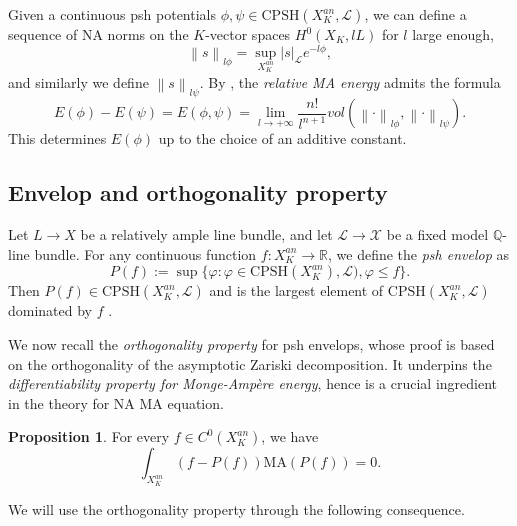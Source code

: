 \documentclass[a4paper]{article}
\theoremstyle{definition}
\newtheorem{prop}[thm]{Proposition}
\newcommand{\R}{\mathbb{R}}
\newcommand{\Q}{\mathbb{Q}}
\newcommand{\norm}[1]{\left\lVert#1\right\rVert}
\begin{document}
	
	
	
	
	
	Given a continuous psh potentials $\phi, \psi \in \text{CPSH}(X_K^{an}, \mathcal{L})$, we can define a sequence of NA norms on the $K$-vector spaces $H^0(X_K, lL)$ for $l$ large enough,
	\[
	\norm{s}_{l\phi}= \sup_{X_K^{an}} |s|_{\mathcal{L}} e^{-l\phi},
	\]
	and similarly we define $\norm{s}_{l\psi}$. 
	By \cite[Theorem A]{Boucksomnew1}, the \emph{relative MA energy} admits the formula
	\[
	E(\phi)-E(\psi)= E(\phi, \psi)=  \lim_{l\to +\infty} \frac{n!}{ l^{n+1}} vol(   \norm{\cdot}_{l\phi}, \norm{\cdot}_{l\psi}     ) .
	\] 
	This determines $E(\phi)$ up to the choice of an additive constant. 
	
	
	
	
	
	
	
	
			
	\subsection{Envelop and orthogonality property}\label{sec:envelop}
	
	
	
	
	Let $L\to X$ be a relatively ample line bundle, and 
	let $\mathcal{L}\to \mathcal{X}$ be a fixed model $\Q$-line bundle.
	For any continuous function $f: X_K^{an}\to \R$, we define the \emph{psh envelop} as 
	\[
	P(f):= \sup \{    \varphi:  \varphi\in \text{CPSH}(X_K^{an}), \mathcal{L}), \varphi\leq f        \}.
	\]
	Then $P(f)\in \text{CPSH}(X_K^{an}, \mathcal{L})$ and is the largest element of $ \text{CPSH}(X_K^{an}, \mathcal{L})$  dominated by $f$ \cite[Prop. 8.2]{Boucksomsemipositive}. 
	
	

	
	We now recall the \emph{orthogonality property} for psh envelops, whose proof is based on the orthogonality of the asymptotic Zariski decomposition. It underpins the \emph{differentiability property for Monge-Amp\`ere energy}, hence is a crucial ingredient in the theory for NA MA equation.
	
	
	
	\begin{prop}\cite[Appendix A]{Boucksom}
For every  $f\in C^0(X_K^{an})$, we have
	\[
	\int_{X_K^{an}} (f- P(f)) \text{MA}( P(f)  )=0.
	\]
	\end{prop}
	
	
	
	
	We will use the orthogonality property through the following consequence.
	
\end{document}
